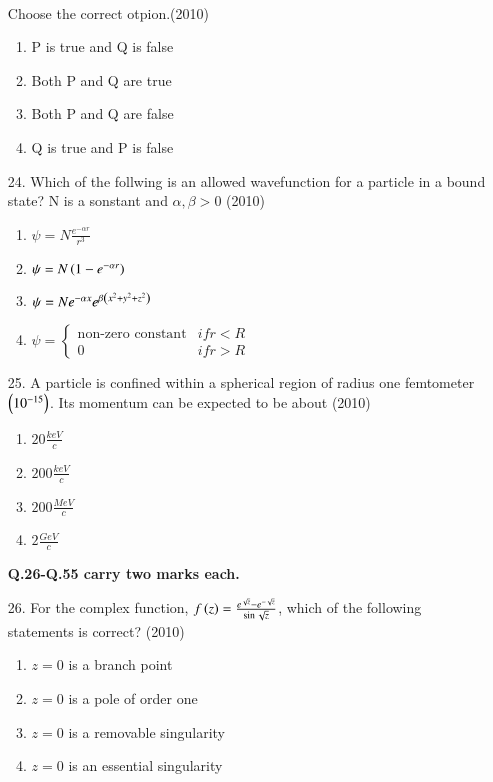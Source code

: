 \documentclass[journal]{IEEEtran}
\begin{document}
\begin{enumerate}
     \\Choose the correct otpion.\hfill (2010)
     \begin{enumerate}[label=(\Alph*)]
        \item P is true and Q is false
        \item Both P and Q are true 
        \item Both P and Q are false
        \item Q is true and P is false
     \end{enumerate}
    \item[24.] Which of the follwing is an allowed wavefunction for a particle in a bound state? N is a sonstant and $\alpha,\beta>0$ \hfill (2010)
    \begin{enumerate}[label=(\Alph*)]
        \item $\psi=N\frac{e^{-\alpha r}}{r^3}$
        \item $\psi=N\left(1-e^{-\alpha r}\right)$
        \item $\psi=Ne^{-\alpha x}e^{\beta\left(x^2+y^2+z^2\right)}$
        \item $\psi=\begin{cases}\text{non-zero constant} & if r<R\\0 & if r>R\end{cases}$
    \end{enumerate}
    \item[25.] A particle is confined within a spherical region of radius one femtometer $\left(10^{-15}\right)$. Its momentum can be expected to be about \hfill (2010)
    \begin{enumerate}[label=(\Alph*)]
        \item $20\frac{keV}{c}$
        \item $200\frac{keV}{c}$
        \item $200\frac{MeV}{c}$
        \item $2\frac{GeV}{c}$
    \end{enumerate}
    \textbf{Q.26-Q.55 carry two marks each.}
    \item[26.] For the complex function, $f\left(z\right)=\frac{e^{\sqrt{z}}-e^{-\sqrt{z}}}{\sin \sqrt{z}}$, which of the following statements is correct? \hfill (2010)
    \begin{enumerate}[label=(\Alph*)]
        \item $z=0$ is a branch point
        \item $z=0$ is a pole of order one
        \item $z=0$ is a removable singularity
        \item $z=0$ is an essential singularity
    \end{enumerate} 
\end{enumerate}
\end{document}
